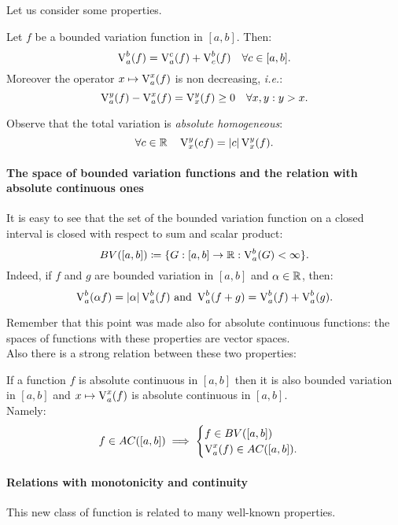 Let us consider some properties.
\begin{prop}
	Let $f$ be a bounded variation function in $[a, b]$.\footnotemark{} Then:
	$$
	\operatorname{V}^b_a(f) 
	= \operatorname{V}^c_a(f) + \operatorname{V}^b_c(f) 
	\quad \forall c \in [a,b].$$
	Moreover the operator $x\mapsto \operatorname{V}^x_a(f)$ is non decreasing, \textit{i.e.}:
	$$\operatorname{V}^y_a(f) -\operatorname{V}^x_a(f) = \operatorname{V}^y_x(f) \geq 0 \quad \forall x,y: y>x.$$
\end{prop}

Observe that the total variation is \textit{absolute homogeneous}:
$$
\forall c \in \mathbb R 
\quad \operatorname{V}^y_x(cf)
= \left\lvert c\right\rvert \operatorname{V}^y_x(f)
.
$$

\paragraph{The space of bounded variation functions and the relation with absolute continuous ones} It is easy to see that the set of the bounded variation function on a closed interval is closed with respect to sum and scalar product:
$$BV([a,b])\coloneqq \{G:[a,b]\to \mathbb R : \operatorname{V}^b_a (G) < \infty\}.$$
 Indeed, if $f$ and $g$ are bounded variation in $[a,b]$ and $\alpha \in \mathbb R$, then:
$$\operatorname{V}_a^b(\alpha f) = \left\lvert\alpha\right\rvert \operatorname{V}_a^b(f) \text{ and } \operatorname{V}_a^b(f+g)= \operatorname{V}_a^b(f)+\operatorname{V}_a^b(g).$$

Remember that this point was made also for absolute continuous functions: the spaces of functions with these properties are vector spaces.\\
Also there is a strong relation between these two properties:

\begin{prop}\label{AC-implies-BV} \label{prop-ac-implies-bv}
	If a function $f$ is absolute continuous in $[a, b]$ then it is also bounded variation in $[a, b]$ and $x\mapsto \operatorname{V}^x_a(f)$ is absolute continuous in $[a, b]$.\footnotemark{}\\
	Namely:
	$$
	f\in AC([a,b]) \implies \begin{cases}
	f \in BV([a,b])\\
	\operatorname{V}_a^x(f) \in AC ([a,b]).
	\end{cases}
	$$
\end{prop}

\paragraph{Relations with monotonicity and continuity} This new class of function is related to many well-known properties.

